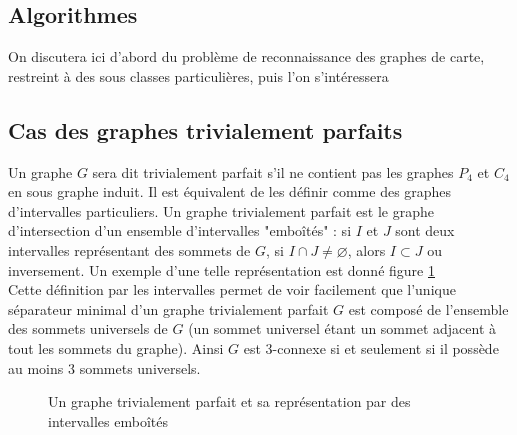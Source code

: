 \documentclass{scrartcl}
\begin{document}
\begin{flushleft}
\section{Algorithmes}

On discutera ici d'abord du problème de reconnaissance des graphes de carte, restreint à des sous classes particulières, puis l'on s'intéressera

\subsection{Cas des graphes trivialement parfaits}

Un graphe $G$ sera dit trivialement parfait s'il ne contient pas les graphes $P_4$ et $C_4$ en sous graphe induit.
Il est équivalent de les définir comme des graphes d'intervalles particuliers. Un graphe trivialement parfait est le graphe
d'intersection d'un ensemble d'intervalles "emboîtés" : si $I$ et $J$ sont deux intervalles représentant des sommets de $G$,
si $I \cap J \neq \varnothing$, alors $I \subset J$ ou inversement. Un exemple d'une telle représentation est donné figure
\ref{extrivperf}\\
Cette définition par les intervalles permet de voir facilement que l'unique séparateur minimal d'un graphe trivialement parfait $G$ est
composé de l'ensemble des sommets universels de $G$ (un sommet universel étant un sommet adjacent à tout les sommets du graphe). Ainsi
$G$ est $3$-connexe si et seulement si il possède au moins $3$ sommets universels.

\begin{figure}[h]
    \caption{Un graphe trivialement parfait et sa représentation par des intervalles emboîtés}\label{extrivperf}
    \begin{center}
\end{center}
\end{figure}
\end{flushleft}
\end{document}
